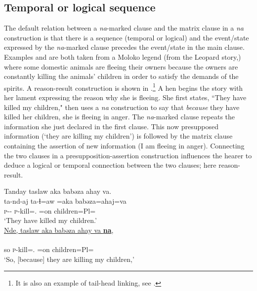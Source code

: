 \subsection{Temporal or logical sequence}\label{sec:11.1.1}
\hypertarget{RefHeading1213181525720847}{}
The default relation between a \textit{na}-marked clause and the matrix clause in a \textit{na} construction is that there is a sequence (temporal or logical) and the event/state expressed by the \textit{na}{}-marked clause precedes the event/state in the main clause. Examples  and  are both taken from a Moloko legend (from the Leopard story,\citealt{Friesen2003}) where some domestic animals are fleeing their owners because the owners are constantly killing the animals’ children in order to satisfy the demands of the spirits. A reason-result construction is shown in .\footnote {It is also an example of tail-head linking, see .}  A hen begins the story with her lament expressing the reason why she is fleeing. She first states, “They have killed my children," then uses a \textit{na} construction to say that \textit{because} they have killed her children, she is fleeing in anger. The \textit{na}{}-marked clause repeats the information she just declared in the first clause. This now presupposed information (‘they are killing my children’) is followed by the matrix clause containing the assertion of new information (I am fleeing in anger). Connecting the two clauses in a presupposition-assertion construction influences the hearer to deduce a logical or temporal connection between the two clauses; here reason-result. 


\ea \label{ex:11:15}
Tanday taslaw aka babəza ahay va.\\   
\gll  ta-nd-aj    ta-ɬ=aw  =aka  babəza=ahaj=va \\
      \textsc{p}-{\PROG}-{\CL}  \textsc{p}-kill={\oneS}.{\IO}  =on  children=Pl{=\PRF} \\    
\glt ‘They have killed my children.’\\

\newpage       
\underline{Nde, taslaw  aka  babəza  ahay  va \textbf{na}},\\      
\gll {}     \\
     so   \textsc{p}-kill={\oneS}.{\IO}  =on  children=Pl={\PRF} {\PSP} \\
\glt ‘So, [because] they are killing my children,’\\
      
